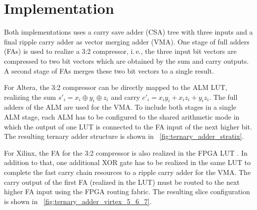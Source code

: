 \documentclass[a4paper,BCOR7mm,12pt,pointlessnumbers,bibtotoc]{scrartcl}
\begin{document}
\section{Implementation}

Both implementations uses a carry save adder (CSA) tree with three inputs and a final ripple carry adder as vector merging adder (VMA). One stage of full adders (FAs) is used to realize a 3:2 compressor, i.\,e., the three input bit vectors are compressed to two bit vectors which are obtained by the sum and carry outputs. A second stage of FAs merges these two bit vectors to a single result.

For Altera, the 3:2 compressor can be directly mapped to the ALM LUT, realizing the sum $s'_i = x_i \oplus y_i \oplus z_i$ and carry $c'_i = x_i y_i + x_i z_i + y_i z_i$. The full adders of the ALM are used for the VMA. 
To include both stages in a single ALM stage, each ALM has to be configured to the shared arithmetic mode \cite{blsy09} in which the output of one LUT is connected to the FA input of the next higher bit. The resulting ternary adder structure is shown in \figurename~\ref{fig:ternary_adder_stratix}. 

For Xilinx, the FA for the 3:2 compressor is also realized in the FPGA LUT \cite{sp07}. In addition to that, one additional XOR gate has to be realized in the same LUT to complete the fast carry chain resources to a ripple carry adder for the VMA. The carry output of the first FA (realized in the LUT) must be routed to the next higher FA input using the FPGA routing fabric.
The resulting slice configuration is shown in \figurename~\ref{fig:ternary_adder_virtex_5_6_7}.
\end{document}
